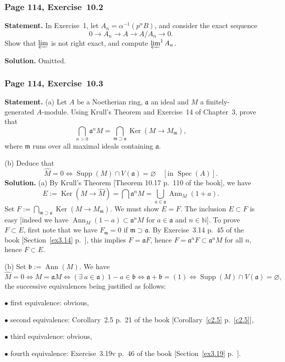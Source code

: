 \documentclass[12pt,letterpaper]{article}%
\newcommand{\oo}{\operatorname}\newcommand{\ooo}{\operatorname*}
\newcommand{\mf}{\mathfrak}
\newcommand{\aaa}{\mf a}
\newcommand{\bbb}{\mf b}
\newcommand{\mmm}{\mf m}
\newcommand{\bu}{\bullet}
\newcommand{\Ker}{\operatorname{Ker}}\newcommand{\Coker}{\operatorname{Coker}}
\newcommand{\Spec}{\operatorname{Spec}}\newcommand{\Sp}{\operatorname{Spec}}
\newcommand{\nn}{\noindent}
\begin{document}
\subsubsection{Page 114, Exercise~10.2}%

\textbf{Statement.} In Exercise~1, let $A_n=\alpha^{-1}(p^nB)$, and consider the exact sequence 
$$
0\to A_n\to A\to A/A_n\to0.
$$ 
Show that $\varprojlim$ is not right exact, and compute $\varprojlim^1A_n$.

\nn\textbf{Solution.} Omitted.%

\subsubsection{Page 114, Exercise~10.3}%

\textbf{Statement.} (a) Let $A$ be a Noetherian ring, $\aaa$ an ideal and $M$ a finitely-generated $A$-module. Using Krull's Theorem and Exercise~14 of Chapter~3, prove that 
$$
\bigcap_{n>0}\aaa^nM=\bigcap_{\mmm\supset\aaa}\Ker(M\to M_\mmm),
$$ 
where $\mmm$ runs over all maximal ideals containing $\aaa$.

\nn(b) Deduce that
$$
\widehat M=0\iff\oo{Supp}(M)\cap V(\aaa)=\varnothing\quad[\text{in }\Spec(A)].
$$
\nn\textbf{Solution.} (a) By Krull's Theorem [Theorem 10.17 p.~110 of the book], we have 
$$
E:=\Ker(M\to\widehat M)=\bigcap\aaa^nM=\bigcup_{a\in\aaa}\oo{Ann}_M(1+a). 
$$ 
Set $F:=\bigcap_{\mmm\supset\aaa}\Ker(M\to M_\mmm)$. We must show $E=F$. The inclusion $E\subset F$ is easy [indeed we have $\oo{Ann}_M(1-a)\subset\aaa^nM$ for $a\in\aaa$ and $n\in\mathbb N$]. To prove $F\subset E$, first note that we have $F_\mmm=0$ if $\mmm\supset\aaa$. By Exercise~3.14 p.~45 of the book [Section~\ref{ex3.14} p.~\pageref{ex3.14}], this implies $F=\aaa F$, hence $F=\aaa^nF\subset\aaa^nM$ for all $n$, hence $F\subset E$. 

\nn(b) Set $\bbb:=\oo{Ann}(M)$. We have 
$$
\widehat M=0\iff M=\aaa M\iff(\exists\ a\in\aaa)\ 1-a\in\bbb\iff\aaa+\bbb=(1)\iff\oo{Supp}(M)\cap V(\aaa)=\varnothing,
$$ 
the successive equivalences being justified as follows:

$\bu$ first equivalence: obvious, 

$\bu$ second equivalence: Corollary~2.5 p.~21 of the book [Corollary~\ref{c2.5} p.~\ref{c2.5}],

$\bu$ third equivalence: obvious,

$\bu$ fourth equivalence: Exercise~3.19v p.~46 of the book [Section~\ref{ex3.19} p.~\pageref{ex3.19}].
\end{document}
